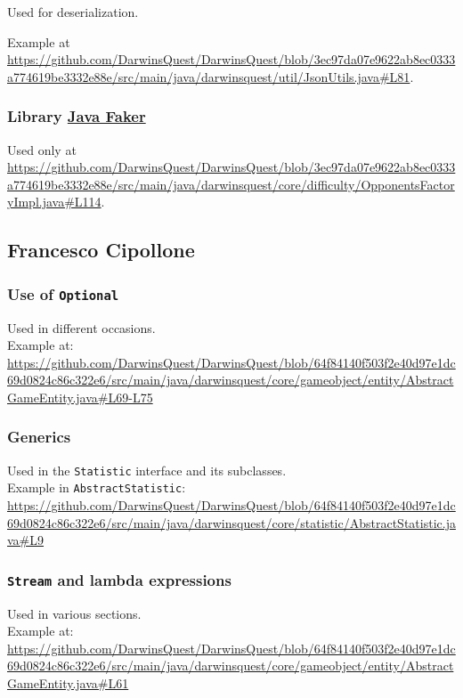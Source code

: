 \documentclass[12pt, a4paper]{report}
\theoremstyle{definition}
\begin{document}
        Used for deserialization.

        Example at \url{https://github.com/DarwinsQuest/DarwinsQuest/blob/3ec97da07e9622ab8ec0333a774619be3332e88e/src/main/java/darwinsquest/util/JsonUtils.java#L81}.
        
        \subsubsection{Library \href{https://github.com/DiUS/java-faker}{Java Faker}}
        
        Used only at \url{https://github.com/DarwinsQuest/DarwinsQuest/blob/3ec97da07e9622ab8ec0333a774619be3332e88e/src/main/java/darwinsquest/core/difficulty/OpponentsFactoryImpl.java#L114}.

    \subsection*{Francesco Cipollone}

    \subsubsection{Use of \texttt{Optional}}
    Used in different occasions.\\
    Example at: \url{https://github.com/DarwinsQuest/DarwinsQuest/blob/64f84140f503f2e40d97e1dc69d0824c86c322e6/src/main/java/darwinsquest/core/gameobject/entity/AbstractGameEntity.java#L69-L75}

    \subsubsection{Generics}
    Used in the \verb|Statistic| interface and its subclasses.\\
    Example in \verb|AbstractStatistic|: \url{https://github.com/DarwinsQuest/DarwinsQuest/blob/64f84140f503f2e40d97e1dc69d0824c86c322e6/src/main/java/darwinsquest/core/statistic/AbstractStatistic.java#L9}

    \subsubsection{\texttt{Stream} and lambda expressions}
    Used in various sections.\\
    Example at: \url{https://github.com/DarwinsQuest/DarwinsQuest/blob/64f84140f503f2e40d97e1dc69d0824c86c322e6/src/main/java/darwinsquest/core/gameobject/entity/AbstractGameEntity.java#L61}
\end{document}

